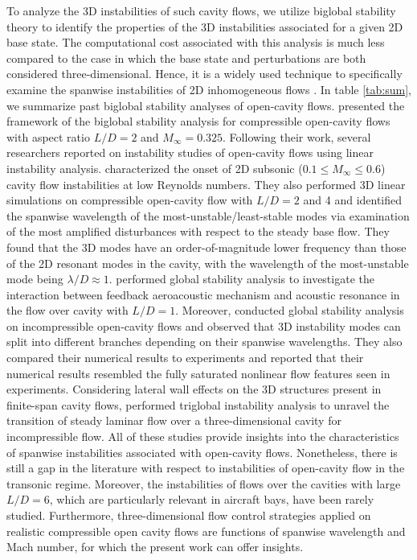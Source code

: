 \documentclass{jfm}
\begin{document}
To analyze the 3D instabilities of such cavity flows, we utilize biglobal stability theory to identify the properties of the 3D instabilities associated for a given 2D base state. The computational cost associated with this analysis is much less compared to the case in which the base state and perturbations are both considered three-dimensional. Hence, it is a widely used technique to specifically examine the spanwise instabilities of 2D inhomogeneous flows \citep{Theofilis:PAS03}. In table \ref{tab:sum}, we summarize past biglobal stability analyses of open-cavity flows. \cite{Theofilis:AIAA04} presented the framework of the biglobal stability analysis for compressible open-cavity flows with aspect ratio $L/D=2$ and $M_\infty=0.325$. Following their work, several researchers reported on instability studies of open-cavity flows using linear instability analysis. \cite{Bres:JFM08} characterized the onset of 2D subsonic ($0.1 \leq M_\infty \leq 0.6$) cavity flow instabilities at low Reynolds numbers. They also performed 3D linear simulations on compressible open-cavity flow with $L/D=2$ and 4 and identified the spanwise wavelength of the most-unstable/least-stable modes via examination of the most amplified disturbances with respect to the steady base flow. They found that the 3D modes have an order-of-magnitude lower frequency than those of the 2D resonant modes in the cavity, with the wavelength of the most-unstable mode being $\lambda/D\approx1$. \cite{Yamouni:JFM13} performed global stability analysis to investigate the interaction between feedback aeroacoustic mechanism and acoustic resonance in the flow over cavity with $L/D=1$. Moreover, \cite{Vicente:JFM14} conducted global stability analysis on incompressible open-cavity flows and observed that 3D instability modes can split into different branches depending on their spanwise wavelengths. They also compared their numerical results to experiments and reported that their numerical results resembled the fully saturated nonlinear flow features seen in experiments. Considering lateral wall effects on the 3D structures present in finite-span cavity flows, \cite{Liu:JFM16} performed triglobal instability analysis to unravel the transition of steady laminar flow over a three-dimensional cavity for incompressible flow. All of these studies provide insights into the characteristics of spanwise instabilities associated with open-cavity flows. Nonetheless, there is still a gap in the literature with respect to instabilities of open-cavity flow in the transonic regime. Moreover, the instabilities of flows over the cavities with large $L/D=6$, which are particularly relevant in aircraft bays, have been rarely studied. Furthermore, three-dimensional flow control strategies applied on realistic compressible open cavity flows \citep{Lusk:EF12,George:AIAA15,Zhang:AIAA15} are functions of spanwise wavelength and Mach number, for which the present work can offer insights.
\end{document}
